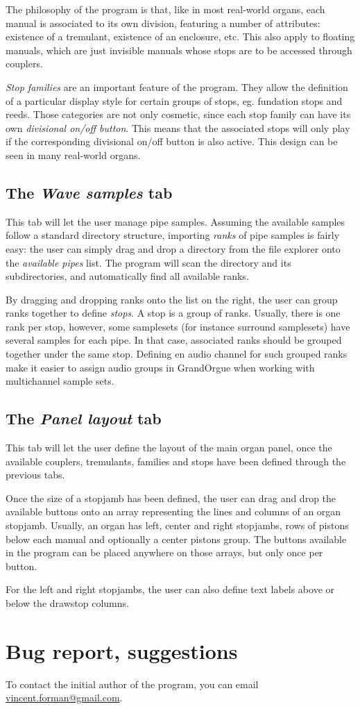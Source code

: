 \documentclass[a4paper,twoside,12pt]{extarticle}
\begin{document}
The philosophy of the program is that, like in most real-world organs, each manual is associated to its own division, featuring a number of attributes: existence of a tremulant, existence of an enclosure, etc. This also apply to floating manuals, which are just invisible manuals whose stops are to be accessed through couplers.

\textit{Stop families} are an important feature of the program. They allow the definition of a particular display style for certain groups of stops, eg. fundation stops and reeds. Those categories are not only cosmetic, since each stop family can have its own \textit{divisional on/off button}. This means that the associated stops will only play if the corresponding divisional on/off button is also active. This design can be seen in many real-world organs.

\subsection{The \textit{Wave samples} tab}

This tab will let the user manage pipe samples. Assuming the available samples follow a standard directory structure, importing \textit{ranks} of pipe samples is fairly easy: the user can simply drag and drop a directory from the file explorer onto the \textit{available pipes} list. The program will scan the directory and its subdirectories, and automatically find all available ranks.

By dragging and dropping ranks onto the list on the right, the user can group ranks together to define \textit{stops}. A stop is a group of ranks. Usually, there is one rank per stop, however, some samplesets (for instance surround samplesets) have several samples for each pipe. In that case, associated ranks should be grouped together under the same stop. Defining en audio channel for such grouped ranks make it easier to assign audio groups in GrandOrgue when working with multichannel sample sets.

\subsection{The \textit{Panel layout} tab}

This tab will let the user define the layout of the main organ panel, once the available couplers, tremulants, families and stops have been defined through the previous tabs.

Once the size of a stopjamb has been defined, the user can drag and drop the available buttons onto an array representing the lines and columns of an organ stopjamb. Usually, an organ has left, center and right stopjambs, rows of pistons below each manual and optionally a center pistons group. The buttons available in the program can be placed anywhere on those arrays, but only once per button.

For the left and right stopjambs, the user can also define text labels above or below the drawstop columns.

\section{Bug report, suggestions}

To contact the initial author of the program, you can email \href{mailto:vincent.forman@gmail.com}{vincent.forman@gmail.com}.
\end{document}
